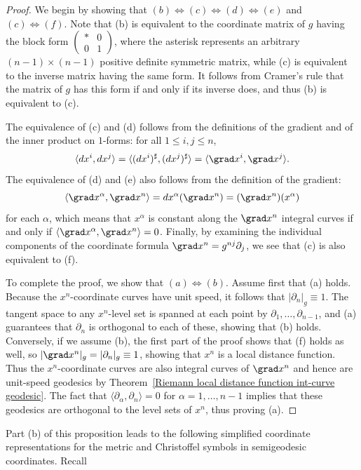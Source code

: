 \begin{proof}
We begin by showing that $(b)\Leftrightarrow(c)\Leftrightarrow(d)\Leftrightarrow(e)$ and $(c)\Leftrightarrow(f)$. Note that (b) is equivalent to the coordinate matrix of 
$g$ having the block form $(\begin{smallmatrix}*&0\\0&1\end{smallmatrix})$, where the asterisk represents an arbitrary $(n-1)\times(n-1)$ positive definite symmetric 
matrix, while (c) is equivalent to the inverse matrix having the same form. It follows from Cramer's rule that the matrix of $g$ has this form if and only if its 
inverse does, and thus (b) is equivalent to (c).\par
The equivalence of (c) and (d) follows from the definitions of the gradient and of the inner product on $1$-forms: for all $1\leq i,j\leq n$,
\[\langle dx^i,dx^j\rangle=\langle(dx^i)^{\sharp},(dx^j)^{\sharp}\rangle=\langle\grad x^i,\grad x^j\rangle.\]
The equivalence of (d) and (e) also follows from the definition of the gradient: 
\[\langle\grad x^\alpha,\grad x^n\rangle=dx^\alpha(\grad x^n)=(\grad x^n)(x^\alpha)\]
for each $\alpha$, which means that $x^\alpha$ is constant along the $\grad x^n$ integral curves if and only if $\langle\grad x^\alpha,\grad x^n\rangle=0$. Finally, by 
examining the individual components of the coordinate formula $\grad x^n=g^{nj}\partial_j$, we see that (c) is also equivalent to (f).\par
To complete the proof, we show that $(a)\Leftrightarrow(b)$. Assume first that (a) holds. Because the $x^n$-coordinate curves have unit speed, it follows that 
$|\partial_n|_g\equiv 1$.  The tangent space to any $x^n$-level set is spanned at each point by $\partial_1,\dots,\partial_{n-1}$, and (a) guarantees that $\partial_n$ 
is orthogonal to each of these, showing that (b) holds. Conversely, if we assume (b), the first part of the proof shows that (f) holds as well, so 
$|\grad x^n|_g=|\partial_n|_g\equiv 1$, showing that $x^n$ is a local distance function. Thus the $x^n$-coordinate curves are also integral curves of $\grad x^n$ and hence 
are unit-speed geodesics by Theorem~\ref{Riemann local distance function int-curve geodesic}. The fact that $\langle\partial_\alpha,\partial_n\rangle=0$ for 
$\alpha=1,\dots,n-1$ implies that these geodesics are orthogonal to the level sets of $x^n$, thus proving (a).
\end{proof}
Part (b) of this proposition leads to the following simplified coordinate representations for the metric and Christoffel symbols in semigeodesic coordinates. Recall 
